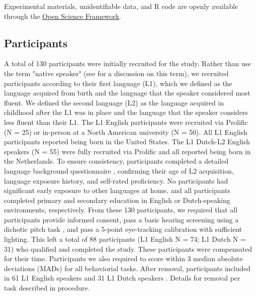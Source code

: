 Experimental materials, unidentifiable data, and R code are openly available through the 
\href{https://osf.io/wa4gv/?view_only=de113dbced6b46fab96ca8217b3c1ca6}{Open Science Framework}.


\subsection{Participants}
A total of 130 participants were initially recruited for the study. Rather than use the term "native speaker" (see \cite{Brown_Tusmagambet_Rahming_Tu_DeSalvo_Wiener_2023} for a discussion on this term), we recruited participants according to their first language (L1), which we defined as the language acquired from birth and the language that the speaker considered most fluent. We defined the second language (L2) as the language acquired in childhood after the L1 was in place and the language that the speaker considers less fluent than their L1. The L1 English participants were recruited via Prolific (N = 25) or in-person at a North American university (N = 50). All L1 English participants reported being born in the United States. The L1 Dutch-L2 English speakers (N = 55) were fully recruited via Prolific and all reported being born in the Netherlands. To ensure consistency, participants completed a detailed language background questionnaire \citep{Marian_Blumenfeld_Kaushanskaya_2007}, confirming their age of L2 acquisition, language exposure history, and self-rated proficiency. No participants had significant early exposure to other languages at home, and all participants completed primary and secondary education in English or Dutch-speaking environments, respectively. From these 130 participants, we required that all participants provide informed consent, pass a basic hearing screening using a dichotic pitch task \citep{milne_2021}, and pass a 5-point eye-tracking calibration with sufficient lighting. This left a total of 88 participants (L1 English N = 74; L1 Dutch N = 31) who qualified and completed the study. These participants were compensated for their time. Participants we also required to score within 3 median absolute deviations (MADs) for all behaviorial tasks. After removal, participants included in  61 L1 English speakers and 31 L1 Dutch speakers \cite{Leys_2013}. Details for removal per task described in procedure.


